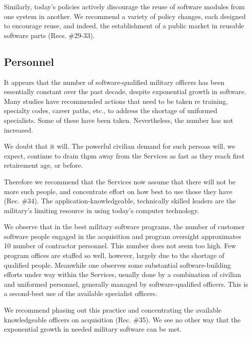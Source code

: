 \documentclass[12pt]{article}
\begin{document}
Similarly, today's policies actively discourage the reuse of software modules from
one system in another. We recommend a variety of policy changes, each designed to
encourage reuse, and indeed, the establishment of a public market in reusable software
parts (Recs. \#29-33).

\subsection*{Personnel}

It appears that the number of software-qualified military officers has been
essentially constant over the past decade, despite exponential growth in
software. Many studies have recommended actions that need to be taken re
training, specialty codes, career paths, etc., to address the shortage of
uniformed specialists. Some of these have been taken.  Nevertheless, the
number has not increased.

We doubt that it will. The powerful civilian demand for such persoas will, we expect,
continue to drain thpm away from the Services as fast as they reach first retairement age,
or before. %

Therefore we recommend that the Services now assume that there will not be more
such people, and concentrate effort on how best to use those they have (Rec. \#34). The
application-knowledgeable, technically skilled leaders are the military's limiting resource
in using today's computer technology.

We observe that in the best military software programs, the number of customer
software people engaged in the acquisition and program oversight approximates 10%
number of contractor personnel. This number does not seem too high. Few program offices
are staffed so well, however, largely due to the shortage of qualified people. Meanwhile
one observes some substantial software-building efforts under way within the Services,
usually done by a combination of civilian and uniformed personnel, generally managed by
software-qualified officers. This is a second-best use of the available specialist officers.

We recommend phasing out this practice and concentrating the available knowledgeable
officers on acquisition (Rec. \#35). We see no other way that the exponential growth in
needed military software can be met.
\end{document}
